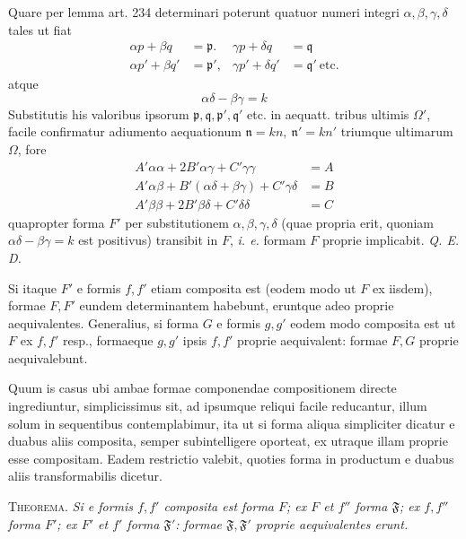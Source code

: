 Quare per lemma art. 234 determinari poterunt quatuor numeri integri $\alpha,\beta,\gamma,\delta$ tales ut fiat
\[
\begin{aligned}
\alpha p+\beta q&=\mathfrak{p}.&\gamma p+\delta q&=\mathfrak{q}\\
\alpha p'+\beta q'&=\mathfrak{p}',&\gamma p'+\delta q'&=\mathfrak{q}'\ \text{etc.}
\end{aligned}
\]
atque
\[
\alpha\delta-\beta\gamma=k
\]
Substitutis his valoribus ipsorum $\mathfrak{p},\mathfrak{q},\mathfrak{p}',\mathfrak{q}'$ etc. in aequatt. tribus ultimis $\Omega'$, facile confirmatur adiumento aequationum $\mathfrak{n}=kn,\ \mathfrak{n}'=kn'$ triumque ultimarum $\Omega$, fore
\[
\begin{aligned}
A'\alpha\alpha+2B'\alpha\gamma+C'\gamma\gamma&=A\\
A'\alpha\beta+B'(\alpha\delta+\beta\gamma)+C'\gamma\delta&=B\\
A'\beta\beta+2B'\beta\delta+C'\delta\delta&=C
\end{aligned}
\]
quapropter forma $F'$ per substitutionem $\alpha,\beta,\gamma,\delta$ (quae propria erit, quoniam $\alpha\delta-\beta\gamma=k$ est positivus) transibit in $F$, \textit{i. e.} formam $F$ proprie implicabit. \textit{Q. E. D.}

Si itaque $F'$ e formis $f,f'$ etiam composita est (eodem modo ut $F$ ex iisdem), formae $F,F'$ eundem determinantem habebunt, eruntque adeo proprie aequivalentes. Generalius, si forma $G$ e formis $g,g'$ eodem modo composita est ut
$F$ ex $f,f'$ resp., formaeque $g,g'$ ipsis $f,f'$ proprie aequivalent: formae $F,G$ proprie aequivalebunt.

Quum is casus ubi ambae formae componendae compositionem directe ingrediuntur, simplicissimus sit, ad ipsumque reliqui facile reducantur, illum solum in sequentibus contemplabimur, ita ut si forma aliqua simpliciter dicatur e duabus aliis composita, semper subintelligere oporteat, ex utraque illam proprie esse compositam. Eadem restrictio valebit, quoties forma in productum e duabus aliis transformabilis dicetur.

\textsc{Theorema.} \textit{Si e formis $f,f'$ composita est forma $F$; ex $F$ et $f''$ forma $\mathfrak{F}$; ex $f,f''$ forma $F'$; ex $F'$ et $f'$ forma $\mathfrak{F}'$: formae $\mathfrak{F},\mathfrak{F}'$ proprie aequivalentes erunt.}

